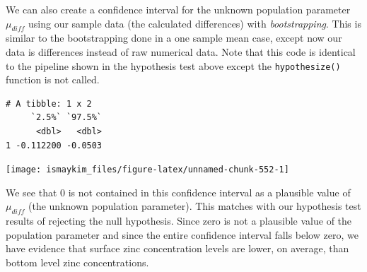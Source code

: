 \documentclass[12pt, krantz2,]{krantz}
\makeatletter
\newenvironment{Shaded}{\begin{snugshade}}{\end{snugshade}}
\newcommand{\DataTypeTok}[1]{\textcolor[rgb]{0.27,0.27,0.27}{#1}}
\newcommand{\DecValTok}[1]{\textcolor[rgb]{0.06,0.06,0.06}{#1}}
\newcommand{\KeywordTok}[1]{\textcolor[rgb]{0.27,0.27,0.27}{\textbf{#1}}}
\newcommand{\NormalTok}[1]{#1}
\newcommand{\OperatorTok}[1]{\textcolor[rgb]{0.43,0.43,0.43}{\textbf{#1}}}
\newcommand{\StringTok}[1]{\textcolor[rgb]{0.5,0.5,0.5}{#1}}
\newenvironment{kframe}{%
\medskip{}
\setlength{\fboxsep}{.8em}
 \def\at@end@of@kframe{}%
 \ifinner\ifhmode%
  \def\at@end@of@kframe{\end{minipage}}%
  \begin{minipage}{\columnwidth}%
 \fi\fi%
 \def\FrameCommand##1{\hskip\@totalleftmargin \hskip-\fboxsep
 \colorbox{shadecolor}{##1}\hskip-\fboxsep
     \hskip-\linewidth \hskip-\@totalleftmargin \hskip\columnwidth}%
 \MakeFramed {\advance\hsize-\width
   \@totalleftmargin\z@ \linewidth\hsize
   \@setminipage}}%
 {\par\unskip\endMakeFramed%
 \at@end@of@kframe}
\renewenvironment{Shaded}{\begin{kframe}}{\end{kframe}}
\makeatother
\begin{document}
We can also create a confidence interval for the unknown population parameter \(\mu_{diff}\) using our sample data (the calculated differences) with \emph{bootstrapping}. This is similar to the bootstrapping done in a one sample mean case, except now our data is differences instead of raw numerical data.
Note that this code is identical to the pipeline shown in the hypothesis test above except the \texttt{hypothesize()} function is not called.

\begin{Shaded}
\end{Shaded}

\begin{Shaded}
\end{Shaded}

\begin{verbatim}
# A tibble: 1 x 2
     `2.5%` `97.5%`
      <dbl>   <dbl>
1 -0.112200 -0.0503
\end{verbatim}

\begin{Shaded}
\end{Shaded}

\begin{center}\texttt{[image: ismaykim\_files/figure-latex/unnamed-chunk-552-1]} \end{center}

We see that 0 is not contained in this confidence interval as a plausible value of \(\mu_{diff}\) (the unknown population parameter). This matches with our hypothesis test results of rejecting the null hypothesis. Since zero is not a plausible value of the population parameter and since the entire confidence interval falls below zero, we have evidence that surface zinc concentration levels are lower, on average, than bottom level zinc concentrations.
\end{document}
